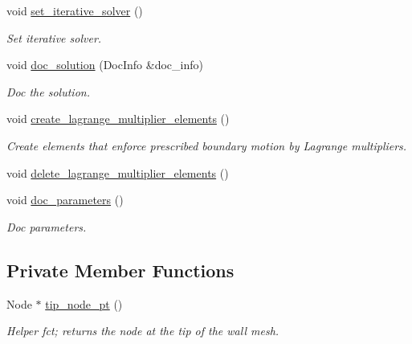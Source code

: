 \begin{DoxyCompactItemize}
void \hyperlink{classFSIChannelWithLeafletProblem_a8ca939c0edc4194e4e5cb7d1404f27de}{set\+\_\+iterative\+\_\+solver} ()
\begin{DoxyCompactList}\small\item\em Set iterative solver. \end{DoxyCompactList}\item 
void \hyperlink{classFSIChannelWithLeafletProblem_adca46cd909199b5721b6e17c15caae02}{doc\+\_\+solution} (Doc\+Info \&doc\+\_\+info)
\begin{DoxyCompactList}\small\item\em Doc the solution. \end{DoxyCompactList}\item 
void \hyperlink{classFSIChannelWithLeafletProblem_aa21f42ff019a517d94dbefdfc270c562}{create\+\_\+lagrange\+\_\+multiplier\+\_\+elements} ()
\begin{DoxyCompactList}\small\item\em Create elements that enforce prescribed boundary motion by Lagrange multipliers. \end{DoxyCompactList}\item 
void \hyperlink{classFSIChannelWithLeafletProblem_aeab2d2d99741e64d83792003db758c38}{delete\+\_\+lagrange\+\_\+multiplier\+\_\+elements} ()
\item 
void \hyperlink{classFSIChannelWithLeafletProblem_a27548bcf25ba14dca9f80ffcbc5792b0}{doc\+\_\+parameters} ()
\begin{DoxyCompactList}\small\item\em Doc parameters. \end{DoxyCompactList}\end{DoxyCompactItemize}
\subsection*{Private Member Functions}
\begin{DoxyCompactItemize}
\item 
Node $\ast$ \hyperlink{classFSIChannelWithLeafletProblem_a00605fef274ac93454d59b525ba4d923}{tip\+\_\+node\+\_\+pt} ()
\begin{DoxyCompactList}\small\item\em Helper fct; returns the node at the tip of the wall mesh. \end{DoxyCompactList}\end{DoxyCompactItemize}
